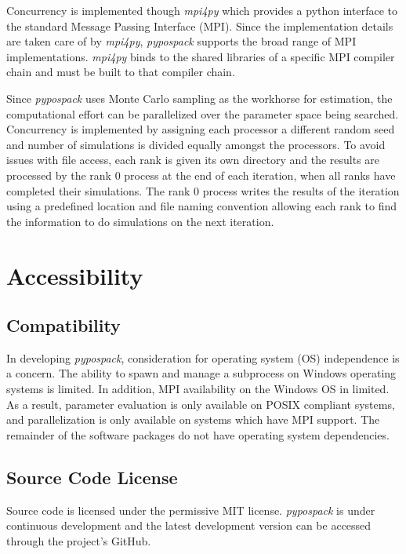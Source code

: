 Concurrency is implemented though \emph{mpi4py} which provides a python interface to the standard Message Passing Interface (MPI).  Since the implementation details are taken care of by \emph{mpi4py}, \emph{pypospack} supports the broad range of MPI implementations.   \emph{mpi4py} binds to the shared libraries of a specific MPI compiler chain and must be built to that compiler chain.

Since \emph{pypospack} uses Monte Carlo sampling as the workhorse for estimation, the computational effort can be parallelized over the parameter space being searched.  Concurrency is implemented by assigning each processor a different random seed and number of simulations is divided equally amongst the processors.  To avoid issues with file access, each rank is given its own directory and the results are processed by the rank $0$ process at the end of each iteration, when all ranks have completed their simulations.  The rank $0$ process writes the results of the iteration using a predefined location and file naming convention allowing each rank to find the information to do simulations on the next iteration.

\section{Accessibility}
\label{sec:software_acessibility}

\subsection{Compatibility}
\label{sec:comptability}

In developing \emph{pypospack}, consideration for operating system (OS) independence is a concern.  The ability to spawn and manage a subprocess on Windows operating systems is limited.  In addition, MPI availability on the  Windows OS in limited.
As a result, parameter evaluation is only available on POSIX compliant systems, and parallelization is only available on systems which have MPI support.  The remainder of the software packages do not have operating system dependencies.

\subsection{Source Code License}

Source code is licensed under the permissive MIT license.  \emph{pypospack} is under continuous development and the latest development version can be accessed through the project's GitHub.

